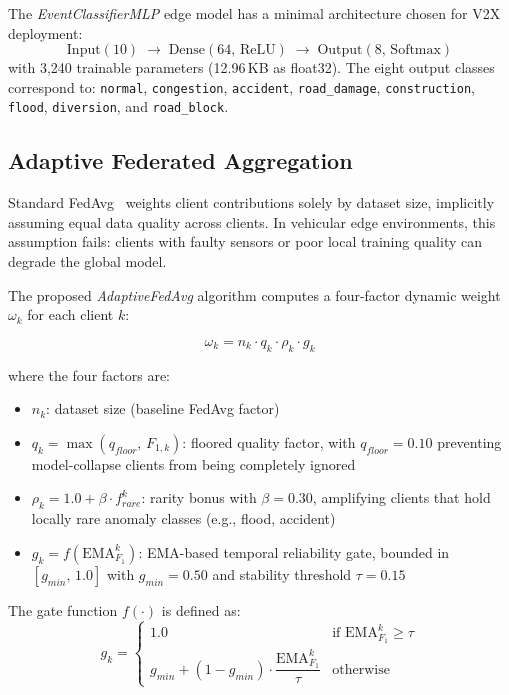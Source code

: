 The \emph{EventClassifierMLP} edge model has a minimal architecture chosen for V2X deployment:
\[
\text{Input}(10) \;\to\; \text{Dense}(64,\,\text{ReLU}) \;\to\; \text{Output}(8,\,\text{Softmax})
\]
with 3,240 trainable parameters (12.96\,KB as float32). The eight output classes correspond to: \texttt{normal}, \texttt{congestion}, \texttt{accident}, \texttt{road\_damage}, \texttt{construction}, \texttt{flood}, \texttt{diversion}, and \texttt{road\_block}.

\subsection{Adaptive Federated Aggregation}

Standard FedAvg~\cite{McMahan_2017} weights client contributions solely by dataset size, implicitly assuming equal data quality across clients. In vehicular edge environments, this assumption fails: clients with faulty sensors or poor local training quality can degrade the global model.

The proposed \emph{AdaptiveFedAvg} algorithm computes a four-factor dynamic weight $\omega_k$ for each client $k$:

\begin{equation}
  \omega_k = n_k \cdot q_k \cdot \rho_k \cdot g_k
  \label{eq:adaptivefedavg_weight}
\end{equation}

where the four factors are:

\begin{itemize}
  \item $n_k$: dataset size (baseline FedAvg factor)
  \item $q_k = \max(q_{floor},\, F_{1,k})$: floored quality factor, with $q_{floor}=0.10$ preventing model-collapse clients from being completely ignored
  \item $\rho_k = 1.0 + \beta \cdot f_{rare}^k$: rarity bonus with $\beta=0.30$, amplifying clients that hold locally rare anomaly classes (e.g., flood, accident)
  \item $g_k = f(\text{EMA}_{F_1}^k)$: EMA-based temporal reliability gate, bounded in $[g_{min},\, 1.0]$ with $g_{min}=0.50$ and stability threshold $\tau=0.15$
\end{itemize}

The gate function $f(\cdot)$ is defined as:
\begin{equation}
  g_k = \begin{cases} 1.0 & \text{if } \text{EMA}_{F_1}^k \geq \tau \\ g_{min} + (1-g_{min}) \cdot \dfrac{\text{EMA}_{F_1}^k}{\tau} & \text{otherwise} \end{cases}
  \label{eq:gate}
\end{equation}

